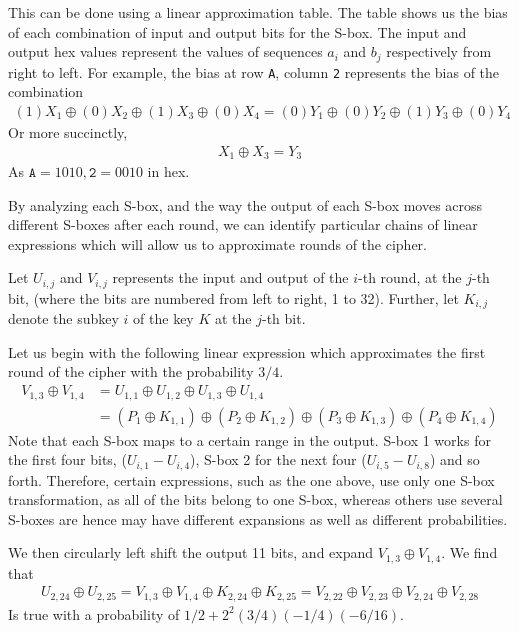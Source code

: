 \documentclass[12pt, a4paper, draft]{report}
\begin{document}
This can be done using a linear approximation table. The table shows us the
bias of each combination of input and output bits for the S-box. The input
and output hex values represent the values of sequences $a_i$ and $b_j$
respectively from right to left. For example, the bias at row \texttt{A},
column \texttt{2} represents the bias of the combination
\begin{align*}
    (1)X_1 \oplus (0)X_2 \oplus (1)X_3 \oplus (0)X_4 =
    (0)Y_1 \oplus (0)Y_2 \oplus (1)Y_3 \oplus (0)Y_4
\end{align*}
Or more succinctly,
\begin{align*}
    X_1 \oplus X_3 = Y_3
\end{align*}
As $\texttt{A} = 1010, \texttt{2} = 0010$ in hex.

By analyzing each S-box, and the way the output of each S-box moves across
different S-boxes after each round, we can identify particular chains of
linear expressions which will allow us to approximate rounds of the cipher.

Let $U_{i,j}$ and $V_{i,j}$ represents the input and output of the $i$-th round, at
the $j$-th bit, (where the bits are numbered from left to right, 1 to 32). Further,
let $K_{i,j}$ denote the subkey $i$ of the key $K$ at the $j$-th bit.

Let us begin with the following linear expression which approximates the first round of
the cipher with the probability $3/4$.
\begin{align*}
    V_{1,3} \oplus V_{1,4} &= U_{1,1} \oplus U_{1,2} \oplus U_{1,3} \oplus U_{1,4}\\
    &= (P_1 \oplus K_{1,1}) \oplus (P_2 \oplus K_{1,2}) \oplus (P_3 \oplus K_{1,3})
    \oplus (P_4 \oplus K_{1,4})
\end{align*}
Note that each S-box maps to a certain range in the output. S-box 1 works for the first
four bits, ($U_{i,1} - U_{i,4}$), S-box 2 for the next four ($U_{i,5} - U_{i,8}$) and so
forth. Therefore, certain expressions, such as the one above, use only one S-box
transformation, as all of the bits belong to one S-box, whereas others use several S-boxes
are hence may have different expansions as well as different probabilities.

We then circularly left shift the output 11 bits, and expand $V_{1,3}
\oplus V_{1,4}$. We find that
\begin{align*}
    U_{2,24} \oplus U_{2,25} = V_{1,3} \oplus V_{1,4} \oplus K_{2,24} \oplus K_{2,25}
    = V_{2,22} \oplus V_{2,23} \oplus V_{2,24} \oplus V_{2,28}
\end{align*}
Is true with a probability of $1/2 + 2^2(3/4)(-1/4)(-6/16)$.
\end{document}
